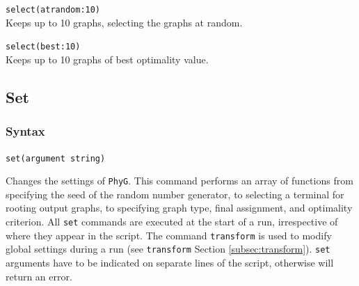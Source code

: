 	\begin{example}
		\item{\texttt{select(atrandom:10)}\\ Keeps up to 10 graphs, selecting the graphs
		 at random.}
						
		\item{\texttt{select(best:10)}\\ Keeps up to 10 graphs of best optimality value.}
	\end{example}

\subsection{Set}
\label{subsec:set}
	\subsubsection{Syntax}
		\texttt{set(argument string)}
	
	\begin{phygdescription}
		{Changes the settings of \texttt{PhyG}. This command performs an array of functions
		from specifying the seed of the random number generator, to selecting a terminal for
		rooting output graphs, to specifying  graph type, final assignment, and optimality 
		criterion. All \texttt{set} commands are executed at the start of a run, irrespective of
		where they appear in the script. The command \texttt{transform} is used to modify 
		global settings during a run (see \texttt{transform} Section \ref{subsec:transform}).
		\texttt{set} arguments have to be indicated on separate lines of the script, otherwise
		\phyg will return an error.}
	\end{phygdescription}
			
